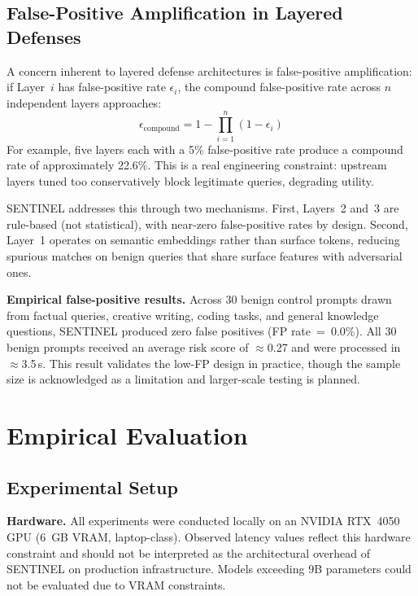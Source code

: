 \documentclass[conference]{IEEEtran}
\begin{document}
\subsection{False-Positive Amplification in Layered Defenses}

A concern inherent to layered defense architectures is false-positive
amplification: if Layer~$i$ has false-positive rate $\epsilon_i$, the
compound false-positive rate across $n$ independent layers approaches:
\begin{equation}
\epsilon_\text{compound} = 1 - \prod_{i=1}^{n}(1 - \epsilon_i)
\label{eq:fp}
\end{equation}
For example, five layers each with a 5\% false-positive rate produce a compound
rate of approximately 22.6\%.
This is a real engineering constraint: upstream layers tuned too conservatively
block legitimate queries, degrading utility.

SENTINEL addresses this through two mechanisms.
First, Layers~2 and~3 are rule-based (not statistical), with near-zero
false-positive rates by design.
Second, Layer~1 operates on semantic embeddings rather than surface tokens,
reducing spurious matches on benign queries that share surface features with
adversarial ones.

\textbf{Empirical false-positive results.}
Across 30 benign control prompts drawn from factual queries, creative writing,
coding tasks, and general knowledge questions, SENTINEL produced zero false
positives (FP rate~=~0.0\%).
All 30 benign prompts received an average risk score of $\approx$0.27 and were processed
in $\approx$3.5\,s.
This result validates the low-FP design in practice, though the sample size
is acknowledged as a limitation and larger-scale testing is planned.

\section{Empirical Evaluation}
\label{sec:experiments}

\subsection{Experimental Setup}

\textbf{Hardware.}
All experiments were conducted locally on an NVIDIA RTX~4050 GPU (6~GB VRAM,
laptop-class).
Observed latency values reflect this hardware constraint and should not be
interpreted as the architectural overhead of SENTINEL on production
infrastructure.
Models exceeding 9B parameters could not be evaluated due to VRAM constraints.
\end{document}

